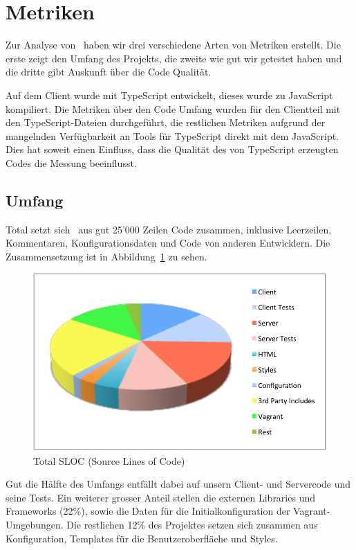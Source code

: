 \section{Metriken}
	Zur Analyse von \eeppi\ haben wir drei verschiedene Arten von Metriken erstellt.
	Die erste zeigt den Umfang des Projekts,
	die zweite wie gut wir getestet haben
	und die dritte gibt Auskunft über die Code Qualität.
	
	Auf dem Client wurde mit TypeScript entwickelt, dieses wurde zu JavaScript kompiliert.
	Die Metriken über den Code Umfang wurden für den Clientteil mit den TypeScript-Dateien durchgeführt,
	die restlichen Metriken aufgrund der mangelnden Verfügbarkeit an Tools für TypeScript direkt mit dem JavaScript.
	Dies hat soweit einen Einfluss, dass die Qualität des von TypeScript erzeugten Codes die Messung beeinflusst.
	
	\subsection{Umfang}
	Total setzt sich \eeppi\ aus gut 25'000 Zeilen Code zusammen, inklusive Leerzeilen, Kommentaren, Konfigurationsdaten und Code von anderen Entwicklern.
	Die Zusammensetzung ist in Abbildung\ \ref{fig:TotalSLOC} zu sehen.
	\begin{figure}[H]
		\includegraphics[width=\largeThird\textwidth]{projectPlan/media/img/totalSLOC.pdf}
		\centering
		\caption{Total SLOC (Source Lines of Code)}
		\label{fig:TotalSLOC}
	\end{figure}
	
	Gut die Hälfte des Umfangs entfällt dabei auf unsern Client- und Servercode und seine Tests.
	Ein weiterer grosser Anteil stellen die externen Libraries und Frameworks (22\%),
	sowie die Daten für die Initialkonfiguration der Vagrant-Umgebungen.
	Die restlichen 12\% des Projektes setzen sich zusammen aus Konfiguration, Templates für die Benutzeroberfläche und Styles.
	
